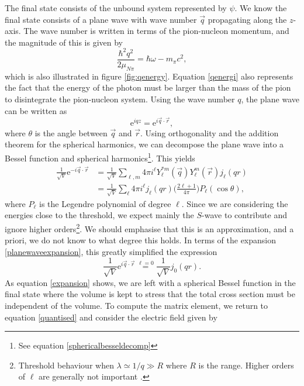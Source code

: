 The final state consists of the unbound system represented by $\psi$. We know the final state consists of a plane wave with wave number $\vec{q}$ propagating along the $z$-axis. The wave number  is written in terms of the pion-nucleon momentum, and the magnitude of this is given by
\begin{equation}\label{qenergi}
	\frac{\hbar^2 q^2}{2\mu_{N\pi}}=\hbar \omega-m_\pi c^2,
\end{equation}
which is also illustrated in figure \ref{fig:qenergy}. Equation \eqref{qenergi} also represents the fact that the energy of the photon must be larger than the mass of the pion to disintegrate the pion-nucleon system. Using the wave number $q$, the plane wave can be written as 
\begin{equation} \label{key}
	\text{e}^{iqz} = \text{e}^{i \vec{q}\cdot \vec{r}},
\end{equation}
where $\theta$ is the angle between $\vec{q}$ and $\vec{r}$. Using orthogonality and the addition theorem for the spherical harmonics, we can decompose the plane wave into a Bessel function and spherical harmonics\footnote{See equation \eqref{sphericalbesseldecomp}}. This yields
\begin{align}\label{planewaveexpansion}
	\frac{1}{\sqrt{V}} \text{e}^{-i\vec{q}\cdot\vec{r}} &= \frac{1}{\sqrt{V}} \sum_{\ell,m} 4\pi i^\ell Y_\ell^{*m}(\vec{q})Y_\ell^m(\vec{r})j_\ell(qr) \\
	&= \frac{1}{\sqrt{V}} \sum_\ell 4\pi i^\ell j_\ell(qr) \bigg( \frac{2\ell+1}{4\pi}\bigg)P_\ell(\cos\theta),
\end{align}
where $P_\ell$ is the Legendre polynomial of degree $\ell$. Since we are considering the energies close to the threshold, we expect mainly the $S$-wave to contribute and ignore higher orders\footnote{Threshold behaviour when $\lambda\simeq1/q\gg R$ where $R$ is the range. Higher orders of $\ell$ are generally not important \cite{Sakurai}.}. We should emphasise that this is an approximation, and a priori, we do not know to what degree this holds. In terms of the expansion \eqref{planewaveexpansion}, this greatly simplified the expression
\begin{equation} \label{expansion}
	\frac{1}{\sqrt{V}}\text{e}^{i\vec{q}\cdot \vec{r}} \stackrel{\ell=0}{=} \frac{1}{\sqrt{V}}j_0(qr).
\end{equation}
As equation \eqref{expansion} shows, we are left with a spherical Bessel function in the final state where the volume is kept to stress that the total cross section must be independent of the volume. To compute the matrix element, we return to equation \eqref{quantised} and consider the electric field given by
